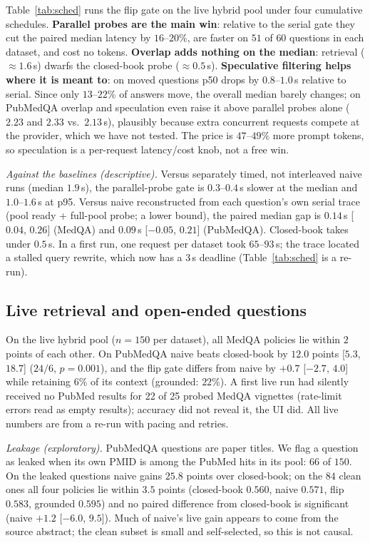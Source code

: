 \documentclass[11pt]{article}
\begin{document}
Table~\ref{tab:sched} runs the flip gate on the live hybrid pool under four
cumulative schedules. \textbf{Parallel probes are the main win}: relative to the
serial gate they cut the paired median latency by $16$--$20\%$, are faster on
$51$ of $60$ questions in each dataset, and cost no tokens. \textbf{Overlap adds nothing on the
median}: retrieval (${\approx}1.6$\,s) dwarfs the closed-book probe
(${\approx}0.5$\,s).
\textbf{Speculative filtering helps where it is meant to}: on moved questions
p50 drops by $0.8$--$1.0$\,s relative to serial. Since only $13$--$22\%$ of
answers move, the overall median barely changes; on PubMedQA overlap and
speculation even raise it above parallel probes alone ($2.23$ and $2.33$ vs.\
$2.13$\,s), plausibly because extra concurrent requests compete at the provider,
which we have not tested. The price is $47$--$49\%$ more prompt tokens, so
speculation is a per-request latency/cost knob, not a free win.

\emph{Against the baselines (descriptive).} Versus separately timed, not
interleaved naive runs (median $1.9$\,s), the parallel-probe gate is
$0.3$--$0.4$\,s slower at the median and $1.0$--$1.6$\,s at p95. Versus naive
reconstructed from each question's own serial trace (pool ready + full-pool
probe; a lower bound), the paired median gap is $0.14$\,s [$0.04$, $0.26$]
(MedQA) and $0.09$\,s [$-0.05$, $0.21$] (PubMedQA). Closed-book takes under
$0.5$\,s. In a first run, one request per dataset took $65$--$93$\,s; the trace located
a stalled query rewrite, which now has a $3$\,s deadline (Table~\ref{tab:sched}
is a re-run).

\subsection{Live retrieval and open-ended questions}
\label{sec:eval-live}
On the live hybrid pool ($n{=}150$ per dataset), all MedQA policies lie within
$2$ points of each other. On PubMedQA naive beats closed-book by $12.0$ points
[$5.3$, $18.7$] ($24/6$, $p{=}0.001$), and the flip gate differs from naive by
$+0.7$ [$-2.7$, $4.0$] while retaining $6\%$ of its context (grounded: $22\%$).
A first live run had silently received no PubMed results for 22 of 25 probed
MedQA vignettes (rate-limit errors read as empty results); accuracy did not
reveal it, the UI did. All live numbers are from a re-run with pacing and
retries.

\emph{Leakage (exploratory).} PubMedQA questions are paper titles. We flag a
question as leaked when its own PMID is among the PubMed hits in its pool: $66$
of $150$. On the leaked questions naive gains $25.8$ points over closed-book; on
the $84$ clean ones all four policies lie within $3.5$ points (closed-book
$0.560$, naive $0.571$, flip $0.583$, grounded $0.595$) and no paired difference
from closed-book is significant (naive $+1.2$ [$-6.0$, $9.5$]). Much of naive's
live gain appears to come from the source abstract; the clean subset is small
and self-selected, so this is not causal.
\end{document}
